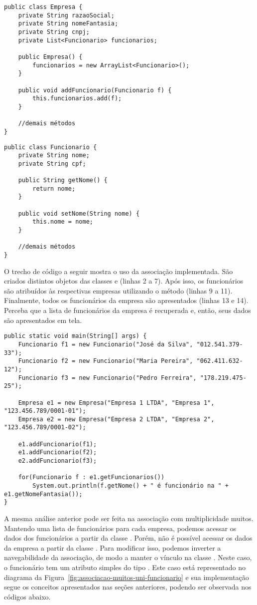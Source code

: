 \begin{verbatim}
public class Empresa {
	private String razaoSocial;
	private String nomeFantasia;
	private String cnpj;
	private List<Funcionario> funcionarios;

	public Empresa() {
		funcionarios = new ArrayList<Funcionario>();
	}

	public void addFuncionario(Funcionario f) {
		this.funcionarios.add(f);
	}
	
	//demais métodos
}
\end{verbatim}

\begin{verbatim}
public class Funcionario {
	private String nome;
	private String cpf;

	public String getNome() {
		return nome;
	}

	public void setNome(String nome) {
		this.nome = nome;
	}
	
	//demais métodos
}
\end{verbatim}

O trecho de código a seguir mostra o uso da associação implementada. São criados distintos objetos das classes  e  (linhas 2 a 7). Após isso, os funcionários são atribuídos às respectivas empresas utilizando o método  (linhas 9 a 11). Finalmente, todos os funcionários da empresa  são apresentados (linhas 13 e 14). Perceba que a lista de funcionários da empresa  é recuperada e, então, seus dados são apresentados em tela.

\begin{verbatim}
public static void main(String[] args) {
	Funcionario f1 = new Funcionario("José da Silva", "012.541.379-33");
	Funcionario f2 = new Funcionario("Maria Pereira", "062.411.632-12");
	Funcionario f3 = new Funcionario("Pedro Ferreira", "178.219.475-25");
	
	Empresa e1 = new Empresa("Empresa 1 LTDA", "Empresa 1", "123.456.789/0001-01");
	Empresa e2 = new Empresa("Empresa 2 LTDA", "Empresa 2", "123.456.789/0001-02");
	
	e1.addFuncionario(f1);
	e1.addFuncionario(f2);
	e2.addFuncionario(f3);
	
	for(Funcionario f : e1.getFuncionarios())
		System.out.println(f.getNome() + " é funcionário na " + e1.getNomeFantasia());
}
\end{verbatim}

A mesma análise anterior pode ser feita na associação com multiplicidade muitos. Mantendo uma lista de funcionários para cada empresa, podemos acessar os dados dos funcionários a partir da classe . Porém, não é possível acessar os dados da empresa a partir da classe . Para modificar isso, podemos inverter a navegabilidade da associação, de modo a manter o vínculo na classe . Neste caso, o funcionário tem um atributo simples do tipo . Este caso está representado no diagrama da Figura~\ref{fig:associacao-muitos-uni-funcionario} e sua implementação segue os conceitos apresentados nas seções anteriores, podendo ser observada nos códigos abaixo.

